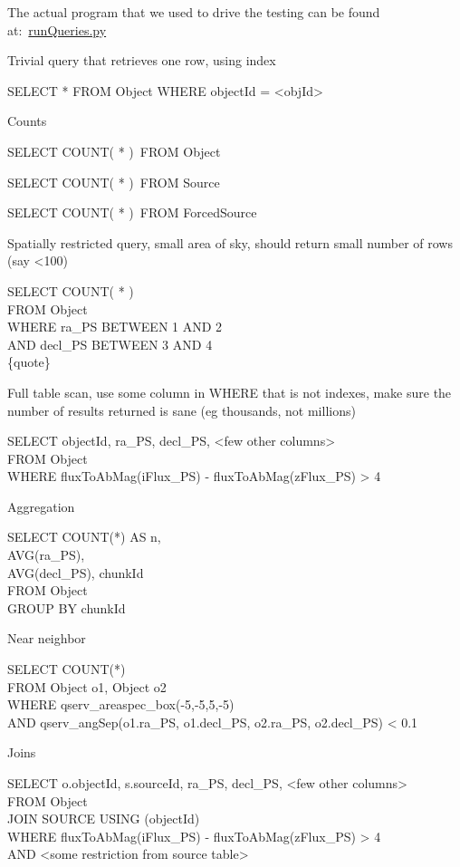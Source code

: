 The actual program that we used to drive the testing can be found
at:~\href{https://github.com/lsst-dm/db_tests_summer15/blob/tickets/DM-3364/DM-3364/runQueries.py}{runQueries.py}

Trivial query that retrieves one row, using index

SELECT * FROM Object WHERE objectId = \textless{}objId\textgreater{}

Counts

SELECT COUNT( * )~FROM Object

SELECT COUNT( * )~FROM Source

SELECT COUNT( * )~FROM ForcedSource

Spatially restricted query, small area of sky, should return small
number of rows (say \textless{}100)

SELECT COUNT( * )\\
FROM Object\\
WHERE ra\_PS BETWEEN 1 AND 2\\
AND decl\_PS BETWEEN 3 AND 4\\
\{quote\}

Full table scan, use some column in WHERE that is not indexes, make sure
the number of results returned is sane (eg thousands, not millions)

SELECT objectId, ra\_PS, decl\_PS, \textless{}few other
columns\textgreater{}\\
FROM Object\\
WHERE fluxToAbMag(iFlux\_PS) - fluxToAbMag(zFlux\_PS) \textgreater{} 4

Aggregation

SELECT COUNT(*) AS n,\\
AVG(ra\_PS),\\
AVG(decl\_PS), chunkId\\
FROM Object\\
GROUP BY chunkId

Near neighbor

SELECT COUNT(*)\\
FROM Object o1, Object o2\\
WHERE qserv\_areaspec\_box(-5,-5,5,-5)\\
AND qserv\_angSep(o1.ra\_PS, o1.decl\_PS, o2.ra\_PS, o2.decl\_PS)
\textless{} 0.1

Joins

SELECT o.objectId, s.sourceId, ra\_PS, decl\_PS, \textless{}few other
columns\textgreater{}\\
FROM Object\\
JOIN SOURCE USING (objectId)\\
WHERE fluxToAbMag(iFlux\_PS) - fluxToAbMag(zFlux\_PS) \textgreater{} 4\\
AND \textless{}some restriction from source table\textgreater{}~

